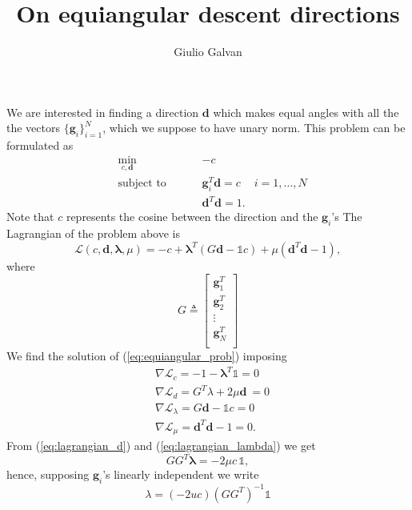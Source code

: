 \documentclass{article}
\title{On equiangular descent directions}
\author{Giulio Galvan}
\renewcommand{\vec}[1]{\boldsymbol{#1}}
\newcommand{\defeq}{\triangleq}
\newcommand{\onevec}{\mathds{1}}
\begin{document}
	\maketitle
	
\noindent
We are interested in finding a direction $\vec{d}$ which makes equal angles with all the the vectors $\{\vec{g}_i\}_{i=1}^N$, which we suppose to have unary norm. This problem can be formulated as
\begin{equation}
\label{eq:equiangular_prob}
\begin{aligned}
& \min_{c,\vec{d}} &&&&-c &\\
& \text{subject to} &&&& \vec{g}_i^T\vec{d} = c & i = 1, \ldots, N\\
& &&&&\vec{d}^T\vec{d} = 1.&
\end{aligned}
\end{equation}
Note that $c$ represents the cosine between the direction and the $\vec{g}_i$'s
The Lagrangian of the problem above is
\begin{equation}
	\mathcal{L}(c,\vec{d},\vec{\lambda},\mu) = -c +\vec{\lambda}^T(G\vec{d}- \onevec c)+ \mu(\vec{d}^T\vec{d}-1),
\end{equation} where
\begin{equation}
G\defeq\begin{bmatrix}
\vec{g}_1^T \\
\vec{g}_2^T \\
\vdots\\
\vec{g}_N^T\\
\end{bmatrix}
\end{equation}
We find the solution of (\ref{eq:equiangular_prob}) imposing
\begin{align}
\label{eq:lagrangian_c}
&\nabla \mathcal{L}_c = -1 - \vec{\lambda}^T \onevec =0\\
\label{eq:lagrangian_d}
&\nabla \mathcal{L}_d = G^T\lambda + 2\mu\vec{d}\ =0\\
\label{eq:lagrangian_lambda}
&\nabla \mathcal{L}_\lambda = G\vec{d} -\onevec c =0\\
\label{eq:lagrangian_mu}
&\nabla \mathcal{L}_\mu = \vec{d}^T\vec{d}-1 =0.
\end{align}
From (\ref{eq:lagrangian_d}) and (\ref{eq:lagrangian_lambda}) we get
\begin{equation}
	\label{eq:step1}
	GG^T\vec{\lambda} = -2\mu c\,  \onevec,
\end{equation}hence, supposing $\vec{g}_i$'s linearly independent we write
\begin{equation}
\label{eq:step2}
	\lambda = (-2uc)(GG^T)^{-1} \onevec
\end{equation}
\end{document}
